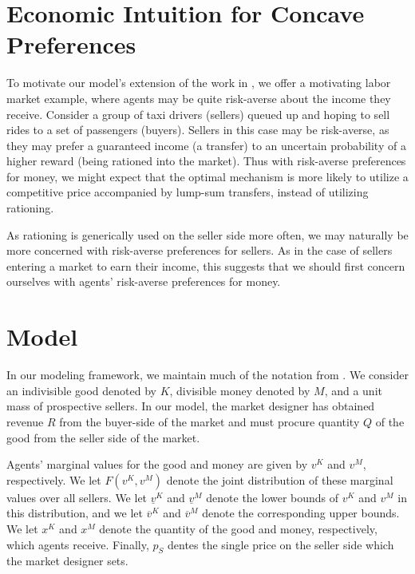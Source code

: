 \documentclass[AER]{AEA}
\begin{document}
\section{Economic Intuition for Concave Preferences}
\label{sec:economic-intuition}

To motivate our model's extension of the work in \cite{dworczak-2020}, we offer a motivating labor market example, where agents may be quite risk-averse about the income they receive. Consider a group of taxi drivers (sellers) queued up and hoping to sell rides to a set of passengers (buyers). Sellers in this case may be risk-averse, as they may prefer a guaranteed income (a transfer) to an uncertain probability of a higher reward (being rationed into the market). Thus with risk-averse preferences for money, we might expect that the optimal mechanism is more likely to utilize a competitive price accompanied by lump-sum transfers, instead of utilizing rationing.

As rationing is generically used on the seller side more often, we may naturally be more concerned with risk-averse preferences for sellers. As in the case of sellers entering a market to earn their income, this suggests that we should first concern ourselves with agents' risk-averse preferences for money.

\section{Model}
\label{sec:model}


In our modeling framework, we maintain much of the notation from \cite{dworczak-2020}. We consider an indivisible good denoted by $K$, divisible money denoted by $M$, and a unit mass of prospective sellers. In our model, the market designer has obtained revenue $R$ from the buyer-side of the market and must procure quantity $Q$ of the good from the seller side of the market.

Agents' marginal values for the good and money are given by $v^K$ and $v^M$, respectively. We let $F(v^K, v^M)$ denote the joint distribution of these marginal values over all sellers. We let $\underline{v}^K$ and $\underline{v}^M$ denote the lower bounds of $v^K$ and $v^M$ in this distribution, and we let $\overline{v}^K$ and $\overline{v}^M$ denote the corresponding upper bounds. We let $x^K$ and $x^M$ denote the quantity of the good and money, respectively, which agents receive. Finally, $p_S$ dentes the single price on the seller side which the market designer sets.
\end{document}

